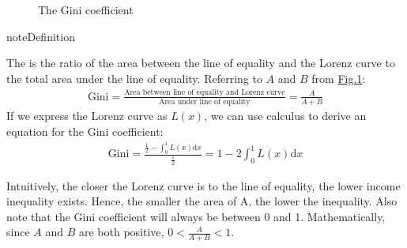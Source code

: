 \documentclass[letterpaper,10pt,english]{jupyterBook}
\let\sphinxpxdimen\pdfpxdimen\else\newdimen\sphinxpxdimen
\begin{document}
\begin{figure}[htbp]
\centering
\capstart

\noindent\sphinxincludegraphics[width=500\sphinxpxdimen]{{Gini}.png}
\caption{The Gini coefficient}\label{\detokenize{content/06-inequality/inequality:gini-coefficient}}\end{figure}

\begin{sphinxadmonition}{note}{Definition}

\sphinxAtStartPar
The  is the ratio of the area between the line of equality and the Lorenz curve to the total area under the line of equality. Referring to \(A\) and \(B\) from \hyperref[\detokenize{content/06-inequality/inequality:gini-coefficient}]{Fig.\@ \ref{\detokenize{content/06-inequality/inequality:gini-coefficient}}}:
\begin{equation*}
\begin{split}\text{Gini} = \frac{\text{Area between line of equality and Lorenz curve}}{\text{Area under line of equality}} = \frac{A}{A+B}\end{split}
\end{equation*}
\sphinxAtStartPar
If we express the Lorenz curve as \(L(x)\), we can use calculus to derive an equation for the Gini coefficient:
\begin{equation*}
\begin{split}\text{Gini} = \frac{\frac{1}{2} - \int_0^1 L(x)\text{d}x}{\frac{1}{2}} = 1 - 2\int_0^1 L(x)\text{d}x\end{split}
\end{equation*}\end{sphinxadmonition}

\sphinxAtStartPar
Intuitively, the closer the Lorenz curve is to the line of equality, the lower income inequality exists. Hence, the smaller the area of A, the lower the inequality.  Also note that the Gini coefficient will always be between 0 and 1. Mathematically, since \(A\) and \(B\) are both positive, \(0<\frac{A}{A+B}<1\).
\end{document}
